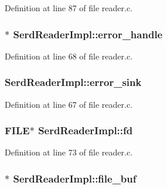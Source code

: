 Definition at line 87 of file reader.\+c.

\subsubsection[{\texorpdfstring{error\+\_\+handle}{error_handle}}]{$\ast$ Serd\+Reader\+Impl\+::error\+\_\+handle}\hypertarget{struct_serd_reader_impl_a71c2449acdc262672cebdae6ea4c714d}{}\label{struct_serd_reader_impl_a71c2449acdc262672cebdae6ea4c714d}


Definition at line 68 of file reader.\+c.

\subsubsection[{\texorpdfstring{error\+\_\+sink}{error_sink}}]{ Serd\+Reader\+Impl\+::error\+\_\+sink}\hypertarget{struct_serd_reader_impl_a2b58643d49634d56a1a9f415af3ee4ad}{}\label{struct_serd_reader_impl_a2b58643d49634d56a1a9f415af3ee4ad}


Definition at line 67 of file reader.\+c.

\subsubsection[{\texorpdfstring{fd}{fd}}]{\setlength{\rightskip}{0pt plus 5cm}F\+I\+LE$\ast$ Serd\+Reader\+Impl\+::fd}\hypertarget{struct_serd_reader_impl_a871444261290dc2606a8b6e10140809f}{}\label{struct_serd_reader_impl_a871444261290dc2606a8b6e10140809f}


Definition at line 73 of file reader.\+c.

\subsubsection[{\texorpdfstring{file\+\_\+buf}{file_buf}}]{$\ast$ Serd\+Reader\+Impl\+::file\+\_\+buf}\hypertarget{struct_serd_reader_impl_ac8afa312459baf236325a58e7b2036a2}{}\label{struct_serd_reader_impl_ac8afa312459baf236325a58e7b2036a2}


